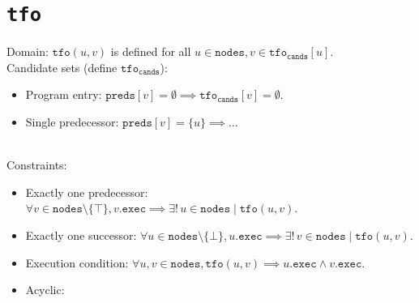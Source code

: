 \documentclass{article}
\newcommand{\tfo}{\texttt{tfo}}
\newcommand{\preds}{\texttt{preds}}
\newcommand{\succs}{\texttt{succs}}
\newcommand{\nodes}{\texttt{nodes}}
\newcommand{\exec}{\texttt{exec}}
\newcommand{\tfocands}{\tfo_\texttt{cands}}
\begin{document}
\section{\tfo}
Domain: $\tfo(u,v)$ is defined for all $u \in \nodes, v \in \tfocands[u]$.
\\
Candidate sets (define $\tfocands$):
\begin{itemize}
\item Program entry: $\preds[v] = \emptyset \implies \tfocands[v] = \emptyset$.
\item Single predecessor: $\preds[v] = \{u\} \implies \ldots$
\end{itemize}
\\
Constraints:
\begin{itemize}
\item Exactly one predecessor:
  $\forall v \in \nodes \setminus \{\top\}, v.\exec \implies \exists!\, u \in \nodes \mid \tfo(u,v)$.
\item Exactly one successor:
  $\forall u \in \nodes \setminus \{\bot\}, u.\exec \implies \exists!\, v \in \nodes \mid \tfo(u,v)$.

\item Execution condition:
  $\forall u, v \in \nodes, \tfo(u,v) \implies u.\exec \wedge v.\exec$.

\item Acyclic:
\end{itemize}
\end{document}
